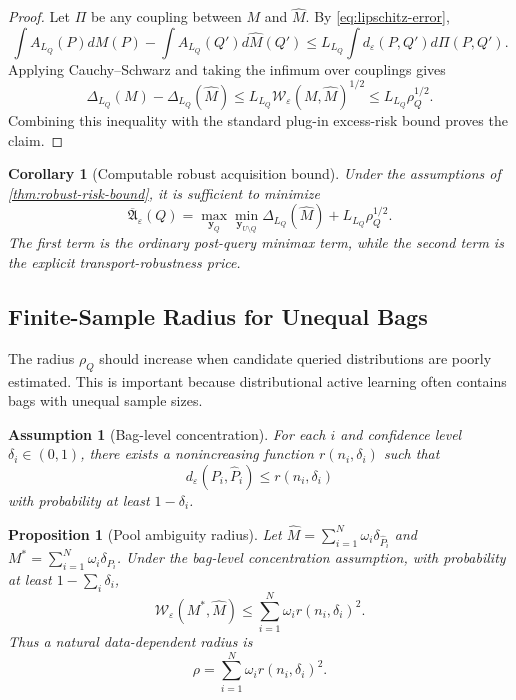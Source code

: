 \documentclass[11pt,a4paper]{article}
\newtheorem{assumption}{Assumption}
\newtheorem{proposition}{Proposition}
\newtheorem{corollary}{Corollary}
\begin{document}
\begin{proof}
Let $\Pi$ be any coupling between $M$ and $\widehat M$. By \cref{eq:lipschitz-error},
\[
\int A_{L_Q}(P)dM(P)-\int A_{L_Q}(Q')d\widehat M(Q')
\le L_{L_Q}\int d_\varepsilon(P,Q')d\Pi(P,Q').
\]
Applying Cauchy--Schwarz and taking the infimum over couplings gives
\[
\Delta_{L_Q}(M)-\Delta_{L_Q}(\widehat M)
\le L_{L_Q}\mathcal{W}_\varepsilon(M,\widehat M)^{1/2}
\le L_{L_Q}\rho_Q^{1/2}.
\]
Combining this inequality with the standard plug-in excess-risk bound proves the claim.
\end{proof}

\begin{corollary}[Computable robust acquisition bound]
\label{cor:computable-acquisition}
Under the assumptions of \cref{thm:robust-risk-bound}, it is sufficient to minimize
\begin{equation}
\overline{\mathfrak{A}}_\varepsilon(Q)
=\max_{\bm y_Q}
\min_{\bm y_{U\setminus Q}}
\Delta_{L_Q}(\widehat M)
+ L_{L_Q}\rho_Q^{1/2}.
\label{eq:computable-bound}
\end{equation}
The first term is the ordinary post-query minimax term, while the second term is the explicit transport-robustness price.
\end{corollary}

\subsection{Finite-Sample Radius for Unequal Bags}

The radius $\rho_Q$ should increase when candidate queried distributions are poorly estimated. This is important because distributional active learning often contains bags with unequal sample sizes.

\begin{assumption}[Bag-level concentration]
For each $i$ and confidence level $\delta_i\in(0,1)$, there exists a nonincreasing function $r(n_i,\delta_i)$ such that
\begin{equation}
d_\varepsilon(P_i,\widehat P_i)\le r(n_i,\delta_i)
\label{eq:bag-concentration}
\end{equation}
with probability at least $1-\delta_i$.
\end{assumption}

\begin{proposition}[Pool ambiguity radius]
\label{prop:radius}
Let $\widehat M=\sum_{i=1}^N\omega_i\delta_{\widehat P_i}$ and $M^*=\sum_{i=1}^N\omega_i\delta_{P_i}$. Under the bag-level concentration assumption, with probability at least $1-\sum_i\delta_i$,
\begin{equation}
\mathcal{W}_\varepsilon(M^*,\widehat M)
\le \sum_{i=1}^N \omega_i r(n_i,\delta_i)^2.
\label{eq:pool-radius}
\end{equation}
Thus a natural data-dependent radius is
\begin{equation}
\rho=\sum_{i=1}^N\omega_i r(n_i,\delta_i)^2.
\label{eq:data-dependent-radius}
\end{equation}
\end{proposition}
\end{document}
